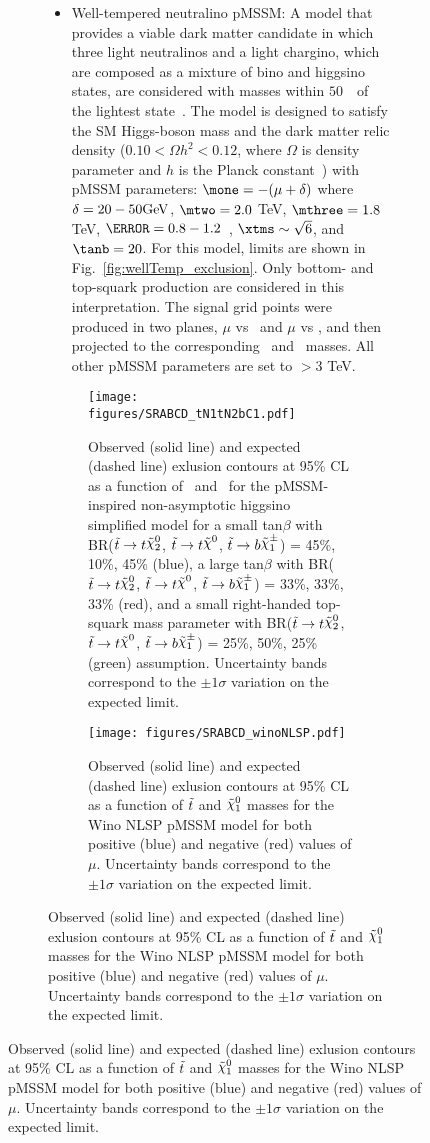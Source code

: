 \begin{figure}[htbp]
\begin{center}
\begin{figure}[htbp]
\begin{center}
{{{\begin{itemize}
	\item Well-tempered neutralino pMSSM: A model that provides a viable dark matter candidate in which three light neutralinos and a light chargino, which are composed as a mixture of bino and higgsino states, are considered with masses within $50$~\GeV\ of the lightest state~\cite{atlasDM,wellTemp}. The model is designed to satisfy the SM Higgs-boson mass and the dark matter relic density ($0.10<\Omega h^{2}<0.12$, where $\Omega$ is density parameter and $h$ is the Planck constant~\cite{relic_density}) with pMSSM parameters: $\mone=-(\mu+\delta)$ where $\delta=20-50\gev$, $\mtwo=2.0$ TeV, $\mthree=1.8$ TeV, $\ms=0.8-1.2$~\TeV, $\xtms\sim\sqrt{6}$, and $\tanb=20$. For this model, limits are shown in Fig.~\ref{fig:wellTemp_exclusion}. Only bottom- and top-squark production are considered in this interpretation. The signal grid points were produced in two planes, $\mu$ vs \mtr\ and $\mu$ vs \mqlthree, and then projected to the corresponding \stop\ and \ninoone\ masses. All other pMSSM parameters are set to $>$3 TeV. 
\end{itemize}

\begin{figure}[htpb]
  \begin{center}
   \texttt{[image: figures/SRABCD\_tN1tN2bC1.pdf]}
    \caption{Observed (solid line) and expected (dashed line) exlusion contours at 95\% CL as a function of \mstop\ and \mLSP\ for the pMSSM-inspired non-asymptotic higgsino simplified model for a small tan$\beta$ with BR($\stop\to t\ninotwo$, $\stop\to t\LSP$, $\stop\to b\chinoonepm$) = 45\%, 10\%, 45\% (blue), a large tan$\beta$ with BR($\stop\to t\ninotwo$, $\stop\to t\LSP$, $\stop\to b\chinoonepm$) = 33\%, 33\%, 33\% (red), and a small right-handed top-squark mass parameter with BR($\stop\to t\ninotwo$, $\stop\to t\LSP$, $\stop\to b\chinoonepm$) = 25\%, 50\%, 25\% (green) assumption. Uncertainty bands correspond to the $\pm 1 \sigma$ variation on the expected limit.}
    \label{fig:nonAsymhiggsino_exclusion}
  \end{center}
\end{figure}


\begin{figure}[htpb]
  \begin{center}
    \texttt{[image: figures/SRABCD\_winoNLSP.pdf]}
    \caption{Observed (solid line) and expected (dashed line) exlusion contours at 95\% CL as a function of $\tilde{t}$ and $\ninoone$ masses for the Wino NLSP pMSSM model for both positive (blue) and negative (red) values of $\mu$. Uncertainty bands correspond to the $\pm 1 \sigma$ variation on the expected limit. %
    }
    \label{fig:winoNLSP_exclusion}
  \end{center}
\end{figure}

}}}
\end{center}
\end{figure}
\end{center}
\end{figure}
